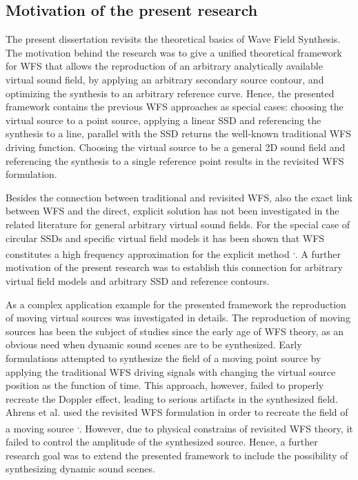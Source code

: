 \documentclass[10pt,twoside]{article}
\theoremstyle{thesisgroupstyle}
\theoremstyle{indented}
\begin{document}
\subsection{Motivation of the present research}
The present dissertation revisits the theoretical basics of Wave Field Synthesis.
The motivation behind the research was to give a unified theoretical framework for WFS that allows the reproduction of an arbitrary analytically available virtual sound field, by applying an arbitrary secondary source contour, and optimizing the synthesis to an arbitrary reference curve.
Hence, the presented framework contains the previous WFS approaches as special cases: choosing the virtual source to a point source, applying a linear SSD and referencing the synthesis to a line, parallel with the SSD returns the well-known traditional WFS driving function.
Choosing the virtual source to be a general 2D sound field and referencing the synthesis to a single reference point results in the revisited WFS formulation.

Besides the connection between traditional and revisited WFS, also the exact link between WFS and the direct, explicit solution has not been investigated in the related literature for general arbitrary virtual sound fields.
For the special case of circular SSDs and specific virtual field models it has been shown that WFS constitutes a high frequency approximation for the explicit method \textsuperscript{,}.
A further motivation of the present research was to establish this connection for arbitrary virtual field models and arbitrary SSD and reference contours.

As a complex application example for the presented framework the reproduction of moving virtual sources was investigated in details.
The reproduction of moving sources has been the subject of studies since the early age of WFS theory, as an obvious need when dynamic sound scenes are to be synthesized.
Early formulations attempted to synthesize the field of a moving point source by applying the traditional WFS driving signals with changing the virtual source position as the function of time.
This approach, however, failed to properly recreate the Doppler effect, leading to serious artifacts in the synthesized field.
Ahrens et al. used the revisited WFS formulation in order to recreate the field of a moving source \textsuperscript{,}.
However, due to physical constrains of revisited WFS theory, it failed to control the amplitude of the synthesized source.
Hence, a further research goal was to extend the presented framework to include the possibility of synthesizing dynamic sound scenes.
\end{document}
